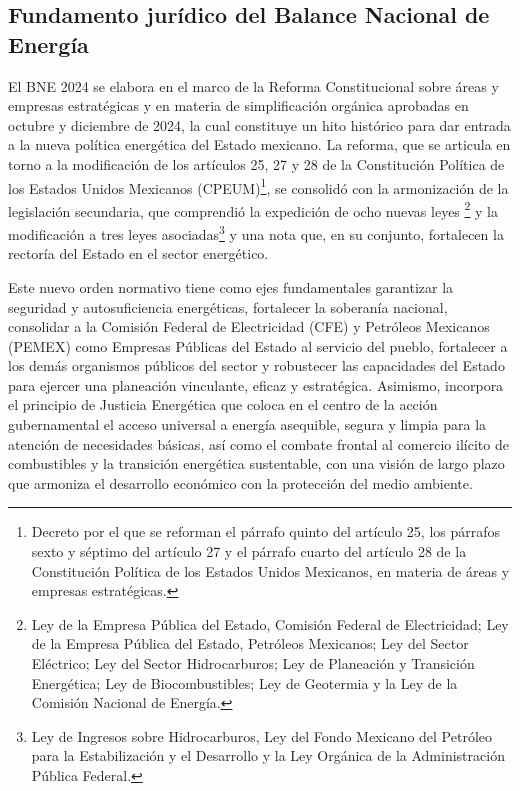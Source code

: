 \documentclass{sener2025}
\begin{document}
\subsection{Fundamento jurídico del Balance Nacional de Energía}

El BNE 2024 se elabora en el marco de la Reforma Constitucional sobre áreas y empresas estratégicas y en materia de simplificación orgánica aprobadas en octubre y diciembre de 2024, la cual constituye un hito histórico para dar entrada a la nueva política energética del Estado mexicano. La reforma, que se articula en torno a la modificación de los artículos 25, 27 y 28 de la Constitución Política de los Estados Unidos Mexicanos (CPEUM)\footnote{Decreto por el que se reforman el párrafo quinto del artículo 25, los párrafos sexto y séptimo del artículo 27 y el párrafo cuarto del artículo 28 de la Constitución Política de los Estados Unidos Mexicanos, en materia de áreas y empresas estratégicas.}, se consolidó con la armonización de la legislación secundaria, que comprendió la expedición de ocho nuevas leyes \footnote{Ley de la Empresa Pública del Estado, Comisión Federal de Electricidad; Ley de la Empresa Pública del Estado, Petróleos Mexicanos; Ley del Sector Eléctrico; Ley del Sector Hidrocarburos; Ley de Planeación y Transición Energética; Ley de Biocombustibles; Ley de Geotermia y la Ley de la Comisión Nacional de Energía.} y la modificación a tres leyes asociadas\footnote{Ley de Ingresos sobre Hidrocarburos, Ley del Fondo Mexicano del Petróleo para la Estabilización y el Desarrollo y la Ley Orgánica de la Administración Pública Federal.} y una nota que, en su conjunto, fortalecen la rectoría del Estado en el sector energético.

Este nuevo orden normativo tiene como ejes fundamentales garantizar la seguridad y autosuficiencia energéticas, fortalecer la soberanía nacional, consolidar a la Comisión Federal de Electricidad (CFE) y Petróleos Mexicanos (PEMEX) como Empresas Públicas del Estado al servicio del pueblo, fortalecer a los demás organismos públicos del sector y robustecer las capacidades del Estado para ejercer una planeación vinculante, eficaz y estratégica. Asimismo, incorpora el principio de Justicia Energética que coloca en el centro de la acción gubernamental el acceso universal a energía asequible, segura y limpia para la atención de necesidades básicas, así como el combate frontal al comercio ilícito de combustibles y la transición energética sustentable, con una visión de largo plazo que armoniza el desarrollo económico con la protección del medio ambiente.
\end{document}
